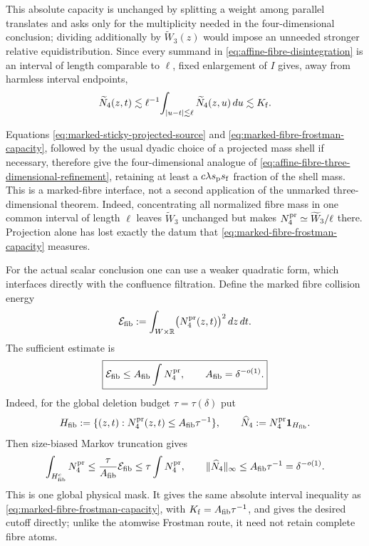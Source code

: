 \documentclass[11pt]{article}
\begin{document}
This absolute capacity is unchanged by splitting a weight among parallel
translates and asks only for the multiplicity needed in the four-dimensional
conclusion; dividing additionally by \(\widetilde W_3(z)\) would impose an
unneeded stronger relative equidistribution.  Since every summand in
\eqref{eq:affine-fibre-disintegration} is an interval of length comparable to
\(\ell\), fixed enlargement of \(I\) gives, away from harmless interval
endpoints,
\begin{equation}\label{eq:fibre-capacity-implies-four-dimensional-cutoff}
 \widetilde N_4(z,t)
 \lesssim \ell^{-1}\!\int_{|u-t|\lesssim\ell}
                    \widetilde N_4(z,u)\,du
 \lesssim K_{\rm f}.
\end{equation}

Equations \eqref{eq:marked-sticky-projected-source} and
\eqref{eq:marked-fibre-frostman-capacity}, followed by the usual dyadic choice
of a projected mass shell if necessary, therefore give the four-dimensional
analogue of \eqref{eq:affine-fibre-three-dimensional-refinement}, retaining at
least a \(c\lambda s_{\rm p}s_{\rm f}\) fraction of the shell mass.  This is a
marked-fibre interface, not a second application of the unmarked
three-dimensional theorem.  Indeed, concentrating all normalized fibre mass
in one common interval of length \(\ell\) leaves \(\widetilde W_3\) unchanged
but makes \(N_4^{\rm pr}\simeq \widetilde W_3/\ell\) there.  Projection
alone has lost exactly the datum that
\eqref{eq:marked-fibre-frostman-capacity} measures.


For the actual scalar conclusion one can use a weaker quadratic form, which
interfaces directly with the confluence filtration.  Define the marked fibre
collision energy
\begin{equation}\label{eq:marked-fibre-collision-energy}
 \mathcal E_{\rm fib}
 :=\int_{W\times\mathbb R}
       \bigl(N_4^{\rm pr}(z,t)\bigr)^2\,dz\,dt .
\end{equation}
The sufficient estimate is
\begin{equation}\label{eq:marked-fibre-energy-gate}
 \boxed{
 \mathcal E_{\rm fib}
 \le A_{\rm fib}\int N_4^{\rm pr},
 \qquad A_{\rm fib}=\delta^{-o(1)}.}
\end{equation}
Indeed, for the global deletion budget \(\tau=\tau(\delta)\) put
\begin{equation}\label{eq:marked-fibre-size-biased-mask}
 H_{\rm fib}
 :=\{(z,t):N_4^{\rm pr}(z,t)
       \le A_{\rm fib}\tau^{-1}\},
 \qquad
 \widehat N_4:=N_4^{\rm pr}{\bf1}_{H_{\rm fib}} .
\end{equation}
Then size-biased Markov truncation gives
\begin{equation}\label{eq:marked-fibre-energy-pruning}
 \int_{H_{\rm fib}^c}N_4^{\rm pr}
 \le\frac{\tau}{A_{\rm fib}}\mathcal E_{\rm fib}
 \le\tau\int N_4^{\rm pr},
 \qquad
 \|\widehat N_4\|_\infty
 \le A_{\rm fib}\tau^{-1}=\delta^{-o(1)}.
\end{equation}
This is one global physical mask.  It gives the same absolute interval
inequality as \eqref{eq:marked-fibre-frostman-capacity}, with
\(K_{\rm f}=A_{\rm fib}\tau^{-1}\), and gives the desired cutoff
directly; unlike the atomwise Frostman route, it need not retain complete fibre
atoms.
\end{document}

